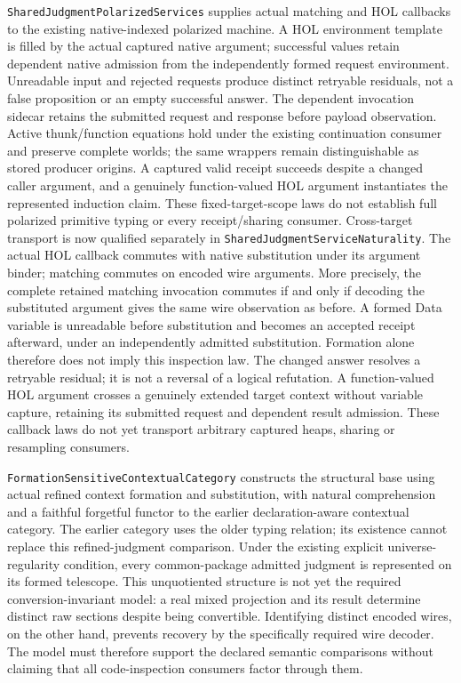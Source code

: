\documentclass[11pt]{article}
\theoremstyle{definition}
\theoremstyle{remark}
\begin{document}
\nolinkurl{SharedJudgmentPolarizedServices} supplies actual matching and
HOL callbacks to the existing native-indexed polarized machine. A HOL
environment template is filled by the actual captured native argument;
successful values retain dependent native admission from the independently
formed request environment. Unreadable input and rejected requests produce
distinct retryable residuals, not a false proposition or an empty successful
answer. The dependent invocation sidecar retains the submitted request and
response before payload observation. Active thunk/function equations hold
under the existing continuation consumer and preserve complete worlds; the
same wrappers remain distinguishable as stored producer origins. A captured
valid receipt succeeds despite a changed caller argument, and a genuinely
function-valued HOL argument instantiates the represented induction claim.
These fixed-target-scope laws do not establish full polarized primitive
typing or every receipt/sharing consumer. Cross-target transport is now
qualified separately in \nolinkurl{SharedJudgmentServiceNaturality}. The
actual HOL callback commutes with native substitution under its argument
binder; matching commutes on encoded wire arguments. More precisely, the
complete retained matching invocation commutes if and only if decoding
the substituted argument gives the same wire observation as before. A
formed Data variable is unreadable before substitution and becomes an
accepted receipt afterward, under an independently admitted substitution.
Formation alone therefore does not imply this inspection law. The changed
answer resolves a retryable residual; it is not a reversal of a logical
refutation. A function-valued HOL argument crosses a genuinely extended
target context without variable capture, retaining its submitted request
and dependent result admission. These callback laws do not yet transport
arbitrary captured heaps, sharing or resampling consumers.

\nolinkurl{FormationSensitiveContextualCategory} constructs the structural
base using actual refined context formation and substitution, with natural
comprehension and a faithful forgetful functor to the earlier
declaration-aware contextual category. The earlier category uses the older
typing relation; its existence cannot replace this refined-judgment
comparison. Under the existing explicit universe-regularity condition, every
common-package admitted judgment is represented on its formed telescope.
This unquotiented structure is not yet the required conversion-invariant
model: a real mixed projection and its result determine distinct raw
sections despite being convertible. Identifying distinct encoded wires,
on the other hand, prevents recovery by the specifically required wire
decoder. The model must therefore support the declared semantic comparisons
without claiming that all code-inspection consumers factor through them.
\end{document}
